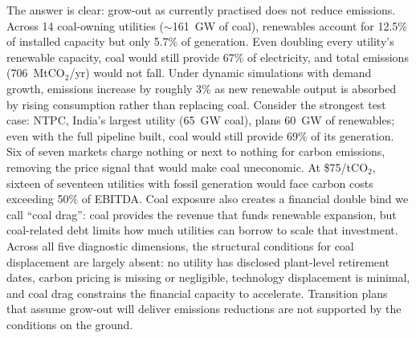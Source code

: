 \documentclass[review,3p,authoryear]{elsarticle}
\begin{document}
The answer is clear: grow-out as currently practised does not reduce emissions. Across 14 coal-owning utilities ($\sim$161~GW of coal), renewables account for 12.5\% of installed capacity but only 5.7\% of generation. Even doubling every utility's renewable capacity, coal would still provide 67\% of electricity, and total emissions (706~MtCO$_2$/yr) would not fall. Under dynamic simulations with demand growth, emissions increase by roughly 3\% as new renewable output is absorbed by rising consumption rather than replacing coal. Consider the strongest test case: NTPC, India's largest utility (65~GW coal), plans 60~GW of renewables; even with the full pipeline built, coal would still provide 69\% of its generation. Six of seven markets charge nothing or next to nothing for carbon emissions, removing the price signal that would make coal uneconomic. At \$75/tCO$_2$, sixteen of seventeen utilities with fossil generation would face carbon costs exceeding 50\% of EBITDA. Coal exposure also creates a financial double bind we call ``coal drag'': coal provides the revenue that funds renewable expansion, but coal-related debt limits how much utilities can borrow to scale that investment. Across all five diagnostic dimensions, the structural conditions for coal displacement are largely absent: no utility has disclosed plant-level retirement dates, carbon pricing is missing or negligible, technology displacement is minimal, and coal drag constrains the financial capacity to accelerate. Transition plans that assume grow-out will deliver emissions reductions are not supported by the conditions on the ground.
\end{document}
